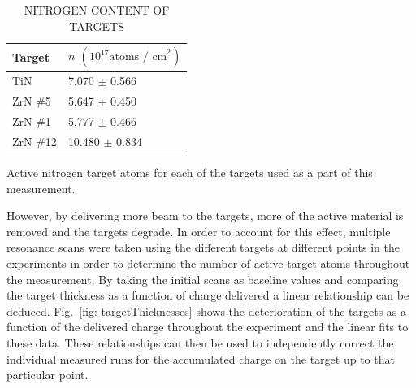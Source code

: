 \begin{table}[]
\caption{NITROGEN CONTENT OF TARGETS}
\centering
\begin{threeparttable}
\begin{tabular}{ll}
\toprule
Target & $n$ $\left(10^{17} \text{atoms / cm}^{2} \right)$ \\ \midrule
TiN    & 7.070 $\pm$ 0.566                        \\
ZrN \#5  & 5.647 $\pm$ 0.450                        \\
ZrN \#1  & 5.777 $\pm$ 0.466                        \\
ZrN \#12 & 10.480 $\pm$ 0.834                       \\ \bottomrule
\end{tabular}
\begin{tablenotes}
\small
\item Active nitrogen target atoms for each of the targets used as a part of this measurement. 
\end{tablenotes}
\end{threeparttable}
\label{tbl: targetAtoms}
\end{table}


However, by delivering more beam to the targets, more of the active material is removed and the targets degrade. In order to account for this effect, multiple resonance scans were taken using the different targets at different points in the experiments in order to determine the number of active target atoms throughout the measurement. By taking the initial scans as baseline values and comparing the target thickness as a function of charge delivered a linear relationship can be deduced. Fig.\ \ref{fig: targetThicknesses} shows the deterioration of the targets as a function of the delivered charge throughout the experiment and the linear fits to these data. These relationships can then be used to independently correct the individual measured runs for the accumulated charge on the target up to that particular point. 

